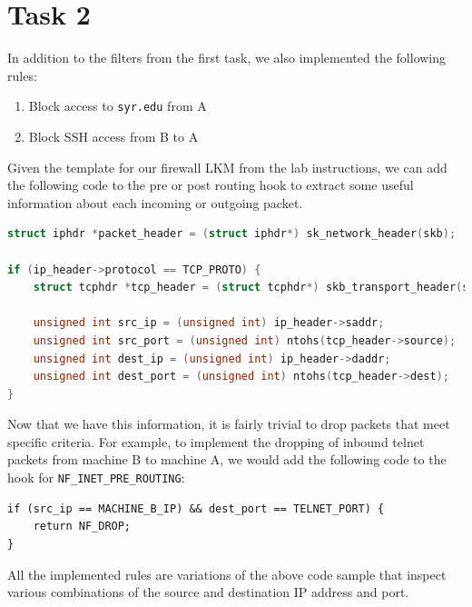\documentclass[12pt,letterpaper]{article}
\begin{document}
	\section*{Task 2}
		In addition to the filters from the first task, we also implemented the following rules:
		
		\begin{enumerate}
			\item Block access to \texttt{syr.edu} from A
			\item Block SSH access from B to A
		\end{enumerate}
	
		Given the template for our firewall LKM from the lab instructions, we can add the following code to the pre or post routing hook to extract some useful information about each incoming or outgoing packet.
	
		\begin{lstlisting}[caption={Extracting info from packets.}, language=c]
struct iphdr *packet_header = (struct iphdr*) sk_network_header(skb);

if (ip_header->protocol == TCP_PROTO) {
	struct tcphdr *tcp_header = (struct tcphdr*) skb_transport_header(skb);
	
	unsigned int src_ip = (unsigned int) ip_header->saddr;
	unsigned int src_port = (unsigned int) ntohs(tcp_header->source);
	unsigned int dest_ip = (unsigned int) ip_header->daddr;
	unsigned int dest_port = (unsigned int) ntohs(tcp_header->dest);
}
		\end{lstlisting}
		
		Now that we have this information, it is fairly trivial to drop packets that meet specific criteria. For example, to implement the dropping of inbound telnet packets from machine B to machine A, we would add the following code to the hook for \texttt{NF\_INET\_PRE\_ROUTING}:
		
		\begin{lstlisting}[caption={Blocking telnet traffic from machine B to machine A}]
if (src_ip == MACHINE_B_IP) && dest_port == TELNET_PORT) {
	return NF_DROP;
}
		\end{lstlisting}
		
		All the implemented rules are variations of the above code sample that inspect various combinations of the source and destination IP address and port.
		
\end{document}
